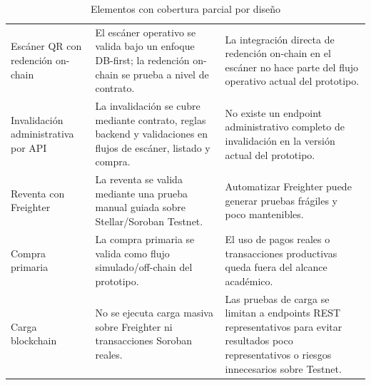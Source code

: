 \documentclass[12pt,letterpaper]{article}
\begin{document}
\begin{table}[H]
\centering

\begingroup
\scriptsize
\setlength{\tabcolsep}{3pt}
\renewcommand{\arraystretch}{1.22}

\begin{tabularx}{\textwidth}{|
>{\raggedright\arraybackslash}p{3.2cm}|
>{\raggedright\arraybackslash}X|
>{\raggedright\arraybackslash}p{4.0cm}|}
\hline
\multicolumn{1}{|>{\centering\arraybackslash}m{3.2cm}|}{\textbf{Elemento}} &
\multicolumn{1}{>{\centering\arraybackslash}m{6.6cm}|}{\textbf{Cobertura actual}} &
\multicolumn{1}{>{\centering\arraybackslash}m{4.0cm}|}{\textbf{Justificación}} \\
\hline

Escáner QR con redención on-chain &
El escáner operativo se valida bajo un enfoque DB-first; la redención on-chain se prueba a nivel de contrato. &
La integración directa de redención on-chain en el escáner no hace parte del flujo operativo actual del prototipo. \\
\hline

Invalidación administrativa por API &
La invalidación se cubre mediante contrato, reglas backend y validaciones en flujos de escáner, listado y compra. &
No existe un endpoint administrativo completo de invalidación en la versión actual del prototipo. \\
\hline

Reventa con Freighter &
La reventa se valida mediante una prueba manual guiada sobre Stellar/Soroban Testnet. &
Automatizar Freighter puede generar pruebas frágiles y poco mantenibles. \\
\hline

Compra primaria &
La compra primaria se valida como flujo simulado/off-chain del prototipo. &
El uso de pagos reales o transacciones productivas queda fuera del alcance académico. \\
\hline

Carga blockchain &
No se ejecuta carga masiva sobre Freighter ni transacciones Soroban reales. &
Las pruebas de carga se limitan a endpoints REST representativos para evitar resultados poco representativos o riesgos innecesarios sobre Testnet. \\
\hline

\end{tabularx}

\endgroup

\caption{Elementos con cobertura parcial por diseño}
\label{tab:cobertura-parcial-diseno}
\end{table}
\end{document}
